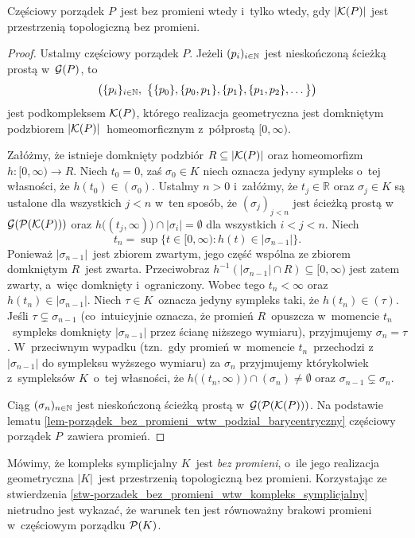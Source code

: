 \begin{stw}\label{stw-porzadek_bez_promieni_wtw_kompleks_symplicjalny}
Częściowy porządek $P$~jest bez promieni wtedy i~tylko wtedy, gdy $|\mathcal{K}(P)|$ jest przestrzenią topologiczną bez promieni.
\end{stw}
\begin{proof}
Ustalmy częściowy porządek $P$. Jeżeli $(p_i)_{i\in\mathbb{N}}$ jest nieskończoną ścieżką prostą w~$\mathcal{G}(P)$, to  \[\left(\{p_i\}_{i\in\mN},\ \big\{\{p_0\},\{p_0,p_1\},\{p_1\},\{p_1,p_2\},\ldots\big\}\right)\] jest podkompleksem $\mathcal{K}(P)$, którego realizacja geometryczna jest domkniętym podzbiorem $|\mathcal{K}(P)|$~homeomorficznym z~półprostą $[0,\infty)$. 

Załóżmy, że istnieje domknięty podzbiór $R\subseteq |\mathcal{K}(P)|$ oraz homeomorfizm $h\colon [0,\infty)\to R$. Niech $t_0=0$, zaś $\sigma_0\in K$ niech oznacza jedyny sympleks o~tej własności, że $h(t_0)\in (\sigma_0)$. Ustalmy $n>0$ i~załóżmy, że $t_j\in\mathbb{R}$ oraz $\sigma_j\in K$ są ustalone dla wszystkich $j< n$ w~ten sposób, że $(\sigma_j)_{j<n}$ jest ścieżką prostą w~$\mathcal{G}(\mathcal{P}(\mathcal{K}(P)))$ oraz $h\bigl((t_j,\infty)\bigr)\cap |\sigma_i|=\emptyset$ dla wszystkich $i<j<n$. Niech \[t_n=\sup\{t\in [0,\infty):h(t)\in |\sigma_{n-1}|\}.\] Ponieważ $|\sigma_{n-1}|$~jest zbiorem zwartym, jego część wspólna ze zbiorem domkniętym $R$~jest zwarta. Przeciwobraz $h^{-1}(|\sigma_{n-1}|\cap R)\subseteq [0,\infty)$ jest zatem zwarty, a~więc domknięty i~ograniczony. Wobec tego $t_n<\infty$ oraz $h(t_n)\in |\sigma_{n-1}|$. Niech $\tau\in K$~oznacza jedyny sympleks taki, że $h(t_n)\in (\tau)$. Jeśli $\tau\subsetneq \sigma_{n-1}$ (co~intuicyjnie oznacza, że promień $R$~opuszcza w~momencie $t_n$~sympleks domknięty $|\sigma_{n-1}|$ przez ścianę niższego wymiaru), przyjmujemy $\sigma_n=\tau$. W~przeciwnym wypadku (tzn.~gdy promień w~momencie $t_n$~przechodzi z~$|\sigma_{n-1}|$ do sympleksu wyższego wymiaru) za $\sigma_{n}$ przyjmujemy którykolwiek z~sympleksów $K$~o~tej własności, że $h\bigl((t_n,\infty)\bigr)\cap (\sigma_n)\not=\emptyset$ oraz $\sigma_{n-1}\subsetneq \sigma_{n}$.

Ciąg $(\sigma_n)_{n\in\mathbb{N}}$ jest nieskończoną ścieżką prostą w~$\mathcal{G}(\mathcal{P}(\mathcal{K}(P)))$. Na podstawie lematu \ref{lem-porządek_bez_promieni_wtw_podzial_barycentryczny} częściowy porządek $P$~zawiera promień.
\end{proof}

Mówimy, że kompleks symplicjalny $K$~jest \textit{bez promieni}, o~ile jego realizacja geometryczna $|K|$~jest przestrzenią topologiczną bez promieni. Korzystając ze  stwierdzenia \ref{stw-porzadek_bez_promieni_wtw_kompleks_symplicjalny} nietrudno jest wykazać, że warunek ten jest równoważny brakowi promieni w~częściowym porządku $\mathcal{P}(K)$.

